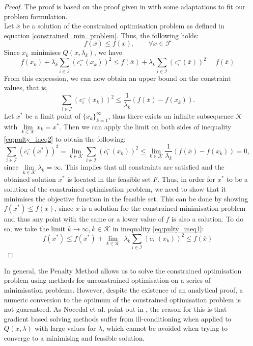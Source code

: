 \begin{proof}
	The proof is based on the proof given in \cite{NoceWrig06} with some adaptations to fit our problem formulation.\\
	Let $\overline{x}$ be a solution of the constrained optimisation problem as defined in equation \eqref{constrained_min_problem}. Thus, the following holds: \[ f(\overline{x}) \leq f(x), \qquad \forall x \in \mathcal{F}\]
	Since $x_k$ minimises $Q(x, \lambda_k)$, we have 
	\begin{equation}
	\label{eq:pnlty_ineq1}
	f(x_k) + \lambda_k \sum_{i \in \mathcal{I}} (c_i^{-}(x_k))^2 \leq 
	f(\overline{x}) + \lambda_k \sum_{i \in \mathcal{I}} (c_i^{-}(\overline{x}))^2 =
	f(\overline{x})
	\end{equation}
	From this expression, we can now obtain an upper bound on the constraint values, that is, 
	\begin{equation}
	\label{eq:pnlty_ineq2}
	\sum_{i \in \mathcal{I}} (c_i^{-}(x_k))^2 \leq \frac{1}{\lambda_k} (f(\overline{x}) - f(x_k)).
	\end{equation}
	Let $x^*$ be a limit point of $\{x_k\}_{k = 1}^{\infty}$, thus there exists an infinite subsequence $\mathcal{K}$ with $\underset{k \in \mathcal{K}}{\lim} x_k = x^*$. Then we can apply the limit on both sides of inequality \eqref{eq:pnlty_ineq2} to obtain the following:
	\[ 
	\sum_{i \in \mathcal{I}} (c_i^{-}(x^*))^2 = 
	\underset{k \in \mathcal{K}}{\lim} \sum_{i \in \mathcal{I}} (c_i^{-}(x_k))^2 \leq
	\underset{k \in \mathcal{K}}{\lim} \frac{1}{\lambda_k} (f(\overline{x}) - f(x_k)) = 0,
	 \]
	 since $\underset{k \in \mathcal{K}}{\lim} \lambda_k = \infty$. This implies that all constraints are satisfied and the obtained solution $x^*$ is located in the feasible set $F$. Thus, in order for $x^*$ to be a solution of the constrained optimisation problem, we need to show that it minimises the objective function in the feasible set. This can be done by showing $f(x^*) \leq f(\overline{x})$, since $\overline{x}$ is a solution for the constrained minimisation problem and thus any point with the same or a lower value of $f$ is also a solution. To do so, we take the limit $k \to \infty, k \in \mathcal{K}$ in inequality \eqref{eq:pnlty_ineq1}:
	 \[ f(x^*) \leq f(x^*) +  \underset{k \in \mathcal{K}}{\lim} \,\,\lambda_k \sum_{i \in \mathcal{I}} (c_i^{-}(x_k))^2 \leq f(\overline{x})\]
\end{proof}

In general, the Penalty Method allows us to solve the constrained optimisation problem using methods for unconstrained optimisation on a series of minimisation problems. However, despite the existence of an analytical proof, a numeric conversion to the optimum of the constrained optimisation problem is not guaranteed. As Nocedal et al. point out in \cite{NoceWrig06}, the reason for this is that gradient based solving methods suffer from ill-conditioning when applied to $Q(x, \lambda)$ with large values for $\lambda$, which cannot be avoided when trying to converge to a minimising and feasible solution.


